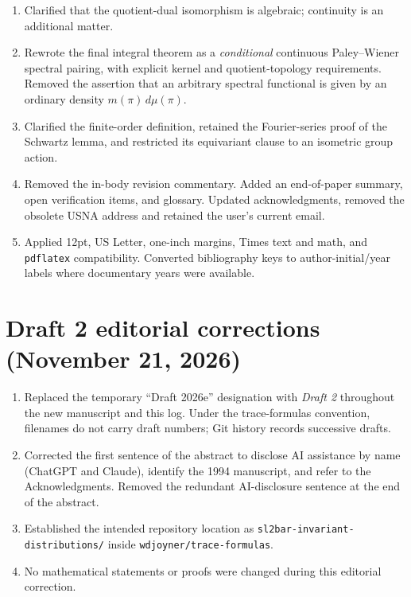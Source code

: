 \documentclass[12pt,letterpaper]{article}
\begin{document}
\begin{enumerate}[leftmargin=*,itemsep=4pt]
the special constituent and the kernel non-tempered, whereas the supplied
2026d correction reverses them.  Demoted the endpoint proposition to a
verification remark and inserted a separate section surveying the original
conjectures without claiming they were all resolved.
\item Clarified that the quotient-dual isomorphism is algebraic;
continuity is an additional matter.
\item Rewrote the final integral theorem as a \emph{conditional}
continuous Paley--Wiener spectral pairing, with explicit kernel and
quotient-topology requirements.  Removed the assertion that an arbitrary
spectral functional is given by an ordinary density $m(\pi)\,d\mu(\pi)$.
\item Clarified the finite-order definition, retained the Fourier-series
proof of the Schwartz lemma, and restricted its equivariant clause to an
isometric group action.
\item Removed the in-body revision commentary. Added an end-of-paper
summary, open verification items, and glossary.  Updated acknowledgments,
removed the obsolete USNA address and retained the user's current email.
\item Applied 12pt, US Letter, one-inch margins, Times text and math,
and \texttt{pdflatex} compatibility.  Converted bibliography keys to
author-initial/year labels where documentary years were available.
\end{enumerate}

\section*{Draft 2 editorial corrections (November 21, 2026)}
\begin{enumerate}[leftmargin=*,itemsep=4pt]
\item Replaced the temporary ``Draft 2026e'' designation with \emph{Draft 2} throughout the new manuscript and this log. Under the trace-formulas convention, filenames do not carry draft numbers; Git history records successive drafts.
\item Corrected the first sentence of the abstract to disclose AI assistance by name (ChatGPT and Claude), identify the 1994 manuscript, and refer to the Acknowledgments. Removed the redundant AI-disclosure sentence at the end of the abstract.
\item Established the intended repository location as \texttt{sl2bar-invariant-distributions/} inside \texttt{wdjoyner/trace-formulas}.
\item No mathematical statements or proofs were changed during this editorial correction.
\end{enumerate}
\end{document}
